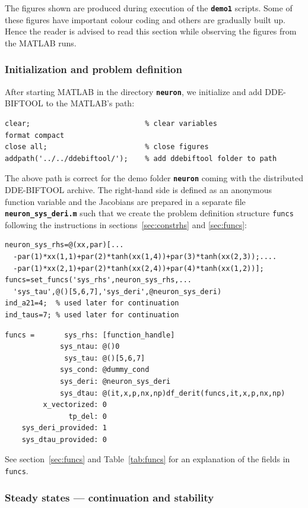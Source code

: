 \documentclass[10pt]{scrartcl}
\newcommand{\DDEBIFCODE}{\textsc{DDE-BIFTOOL}}
\newcommand{\file}[1]{\textbf{\texttt{#1}}}
\newcommand{\blist}[1]{\mbox{\lstinline!#1!}}
\begin{document}
The figures shown are produced during execution of the \file{demo1}
scripts. Some of these figures have important colour coding and others
are gradually built up.  Hence the reader is advised to read this
section while observing the figures from the MATLAB runs.

\subsubsection{Initialization and problem definition}
\label{sec:demo1:init}
After starting MATLAB in the directory \file{neuron},
we initialize and add \DDEBIFCODE{} to the MATLAB's path:
\begin{lstlisting}
clear;                           % clear variables
format compact
close all;                       % close figures
addpath('../../ddebiftool/');    % add ddebiftool folder to path  
\end{lstlisting}
The above path is correct for the demo folder \file{neuron} coming
with the distributed \DDEBIFCODE{} archive. The right-hand side is
defined as an anonymous function variable and the Jacobians are
prepared in a separate file \file{neuron\_sys\_deri.m} such that we
create the problem definition structure \blist{funcs} following the instructions in
sections~\ref{sec:constrhs} and \ref{sec:funcs}:
\begin{lstlisting}
neuron_sys_rhs=@(xx,par)[...
  -par(1)*xx(1,1)+par(2)*tanh(xx(1,4))+par(3)*tanh(xx(2,3));....
  -par(1)*xx(2,1)+par(2)*tanh(xx(2,4))+par(4)*tanh(xx(1,2))];
funcs=set_funcs('sys_rhs',neuron_sys_rhs,...
  'sys_tau',@()[5,6,7],'sys_deri',@neuron_sys_deri)
ind_a21=4;  % used later for continuation
ind_taus=7; % used later for continuation
\end{lstlisting}
{\small
\begin{verbatim}
funcs =       sys_rhs: [function_handle]
             sys_ntau: @()0
              sys_tau: @()[5,6,7]
             sys_cond: @dummy_cond
             sys_deri: @neuron_sys_deri
             sys_dtau: @(it,x,p,nx,np)df_derit(funcs,it,x,p,nx,np)
         x_vectorized: 0
               tp_del: 0
    sys_deri_provided: 1
    sys_dtau_provided: 0
\end{verbatim}
} See section~\ref{sec:funcs} and Table~\ref{tab:funcs} for an
explanation of the fields in \blist{funcs}.  

\subsubsection{Steady states --- continuation and stability}
\label{sec:demo1:stst}
\end{document}
